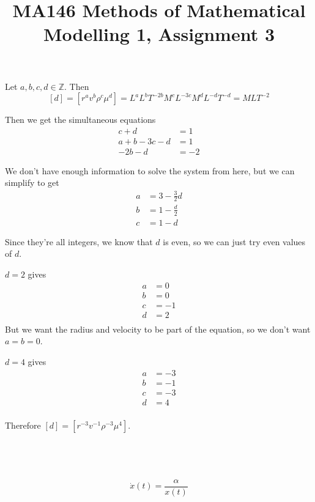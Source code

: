 \documentclass[a4paper]{article}
\title{MA146 Methods of Mathematical Modelling 1, Assignment 3}
\begin{document}
\maketitle

\setlength{\parindent}{0em}
\setlength{\parskip}{1em}


Let $a, b, c, d \in \mathbb Z$. Then $$[d] = \left[ r^a v^b \rho^c \mu^d \right] = L^a L^b T^{-2b} M^c L^{-3c} M^d L^{-d} T^{-d} = MLT^{-2}$$

Then we get the simultaneous equations \begin{align*}
	c + d &= 1\\
	a + b - 3c - d &= 1\\
	-2b - d &= -2
\end{align*}

We don't have enough information to solve the system from here, but we can simplify to get \begin{align*}
	a &= 3 - \frac32 d\\
	b &= 1 - \frac d2\\
	c &= 1 - d
\end{align*}

Since they're all integers, we know that $d$ is even, so we can just try even values of $d$.

$d=2$ gives \begin{align*}
	a &= 0\\
	b &= 0\\
	c &= -1\\
	d &= 2\\
\end{align*}
But we want the radius and velocity to be part of the equation, so we don't want $a=b=0$.

$d=4$ gives \begin{align*}
	a &= -3\\
	b &= -1\\
	c &= -3\\
	d &= 4\\
\end{align*}

Therefore $[d] = \left[ r^{-3} v^{-1} \rho^{-3} \mu^4 \right]$.


\subsection{~}

$$\dot x(t) = \frac{\alpha}{x(t)}$$
\end{document}
